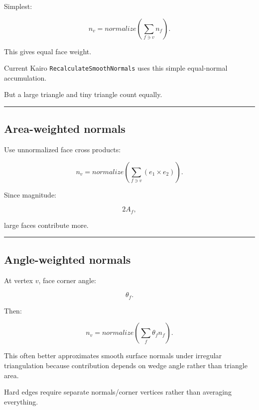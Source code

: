 \hypertarget{04-visual-computing-ii-ch041-smooth-normals}{}

Simplest:

\[
n_v=
normalize
\left(
\sum_{f\ni v}
n_f
\right).
\]

This gives equal face weight.

Current Kairo \texttt{RecalculateSmoothNormals} uses this simple equal-normal accumulation.

But a large triangle and tiny triangle count equally.

\begin{center}\rule{0.5\linewidth}{0.5pt}\end{center}

\subsection{Area-weighted normals}\label{04-visual-computing-ii-ch041-area-weighted-normals}

\hypertarget{04-visual-computing-ii-ch041-area-weighted-normals}{}

Use unnormalized face cross products:

\[
\boxed{
n_v
=
normalize
\left(
\sum_{f\ni v}
(e_1\times e_2)
\right).
}
\]

Since magnitude:

\[
2A_f,
\]

large faces contribute more.

\begin{center}\rule{0.5\linewidth}{0.5pt}\end{center}

\subsection{Angle-weighted normals}\label{04-visual-computing-ii-ch041-angle-weighted-normals}

\hypertarget{04-visual-computing-ii-ch041-angle-weighted-normals}{}

At vertex \(v\), face corner angle:

\[
\theta_f.
\]

Then:

\[
\boxed{
n_v=
normalize
\left(
\sum_f
\theta_fn_f
\right).
}
\]

This often better approximates smooth surface normals under irregular triangulation because contribution depends on wedge angle rather than triangle area.

Hard edges require separate normals/corner vertices rather than averaging everything.

